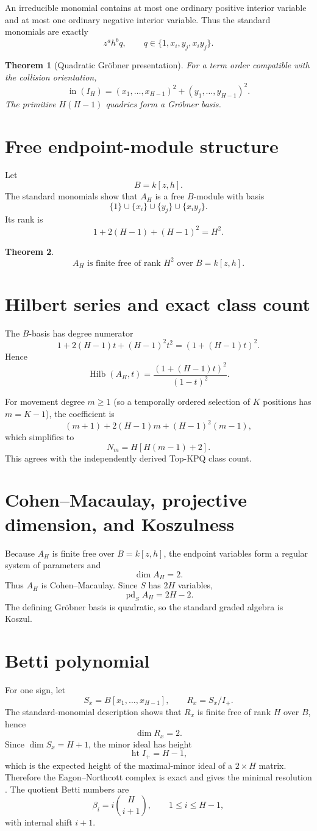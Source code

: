 \documentclass[11pt]{article}
\newtheorem{theorem}{Theorem}
\theoremstyle{definition}
\newcommand{\pd}{\operatorname{pd}}
\newcommand{\Hilb}{\operatorname{Hilb}}
\newcommand{\inI}{\operatorname{in}}
\begin{document}
An irreducible monomial contains at most one ordinary positive interior variable and at most one ordinary negative interior variable. Thus the standard monomials are exactly
\[
z^a h^b q,
\qquad
q\in\{1,x_i,y_j,x_i y_j\}.
\]

\begin{theorem}[Quadratic Gröbner presentation]
For a term order compatible with the collision orientation,
\[
\boxed{
\inI(I_H)=
(x_1,\ldots,x_{H-1})^2+
(y_1,\ldots,y_{H-1})^2.
}
\]
The primitive $H(H-1)$ quadrics form a Gröbner basis.
\end{theorem}

\section{Free endpoint-module structure}
Let
\[
B=k[z,h].
\]
The standard monomials show that $A_H$ is a free $B$-module with basis
\[
\{1\}\cup\{x_i\}\cup\{y_j\}\cup\{x_i y_j\}.
\]
Its rank is
\[
1+2(H-1)+(H-1)^2=H^2.
\]

\begin{theorem}
\[
\boxed{
A_H\text{ is finite free of rank }H^2\text{ over }B=k[z,h].
}
\]
\end{theorem}

\section{Hilbert series and exact class count}
The $B$-basis has degree numerator
\[
1+2(H-1)t+(H-1)^2t^2=(1+(H-1)t)^2.
\]
Hence
\[
\boxed{
\Hilb(A_H,t)=\frac{(1+(H-1)t)^2}{(1-t)^2}.
}
\]

For movement degree $m\ge1$ (so a temporally ordered selection of $K$ positions has $m=K-1$), the coefficient is
\[
(m+1)+2(H-1)m+(H-1)^2(m-1),
\]
which simplifies to
\[
\boxed{
N_m=H[H(m-1)+2].
}
\]
This agrees with the independently derived Top-KPQ class count.

\section{Cohen--Macaulay, projective dimension, and Koszulness}
Because $A_H$ is finite free over $B=k[z,h]$, the endpoint variables form a regular system of parameters and
\[
\dim A_H=2.
\]
Thus $A_H$ is Cohen--Macaulay. Since $S$ has $2H$ variables,
\[
\boxed{
\pd_S A_H=2H-2.
}
\]
The defining Gröbner basis is quadratic, so the standard graded algebra is Koszul.

\section{Betti polynomial}
For one sign, let
\[
S_x=B[x_1,\ldots,x_{H-1}],\qquad R_x=S_x/I_+.
\]
The standard-monomial description shows that $R_x$ is finite free of rank $H$ over $B$, hence
\[
\dim R_x=2.
\]
Since $\dim S_x=H+1$, the minor ideal has height
\[
\operatorname{ht} I_+=H-1,
\]
which is the expected height of the maximal-minor ideal of a $2\times H$ matrix. Therefore the Eagon--Northcott complex is exact and gives the minimal resolution \cite{EagonNorthcott1962}. The quotient Betti numbers are
\[
\beta_i=i\binom H{i+1},
\qquad 1\le i\le H-1,
\]
with internal shift $i+1$.
\end{document}
